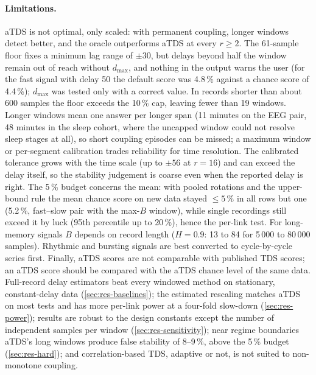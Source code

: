 \documentclass[11pt,a4paper]{article}
\begin{document}
\paragraph{Limitations.} aTDS is not optimal, only scaled: with permanent coupling, longer windows detect better, and the oracle outperforms aTDS at every $r \ge 2$. The 61-sample floor fixes a minimum lag range of $\pm30$, but delays beyond half the window remain out of reach without $d_{\max}$, and nothing in the output warns the user (for the fast signal with delay 50 the default score was 4.8\,\% against a chance score of 4.4\,\%); $d_{\max}$ was tested only with a correct value. In records shorter than about 600 samples the floor exceeds the 10\,\% cap, leaving fewer than 19 windows. Longer windows mean one answer per longer span (11 minutes on the EEG pair, 48 minutes in the sleep cohort, where the uncapped window could not resolve sleep stages at all), so short coupling episodes can be missed; a maximum window or per-segment calibration trades reliability for time resolution. The calibrated tolerance grows with the time scale (up to $\pm56$ at $r = 16$) and can exceed the delay itself, so the stability judgement is coarse even when the reported delay is right. The 5\,\% budget concerns the mean: with pooled rotations and the upper-bound rule the mean chance score on new data stayed $\le 5\,\%$ in all rows but one (5.2\,\%, fast--slow pair with the max-$B$ window), while single recordings still exceed it by luck (95th percentile up to 20\,\%), hence the per-link test. For long-memory signals $B$ depends on record length ($H = 0.9$: 13 to 84 for 5\,000 to 80\,000 samples). Rhythmic and bursting signals are best converted to cycle-by-cycle series first. Finally, aTDS scores are not comparable with published TDS scores; an aTDS score should be compared with the aTDS chance level of the same data. Full-record delay estimators beat every windowed method on stationary, constant-delay data (\cref{sec:res-baselines}); the estimated rescaling matches aTDS on most tests and has more per-link power at a four-fold slow-down (\cref{sec:res-power}); results are robust to the design constants except the number of independent samples per window (\cref{sec:res-sensitivity}); near regime boundaries aTDS's long windows produce false stability of 8--9\,\%, above the 5\,\% budget (\cref{sec:res-hard}); and correlation-based TDS, adaptive or not, is not suited to non-monotone coupling.
\end{document}
